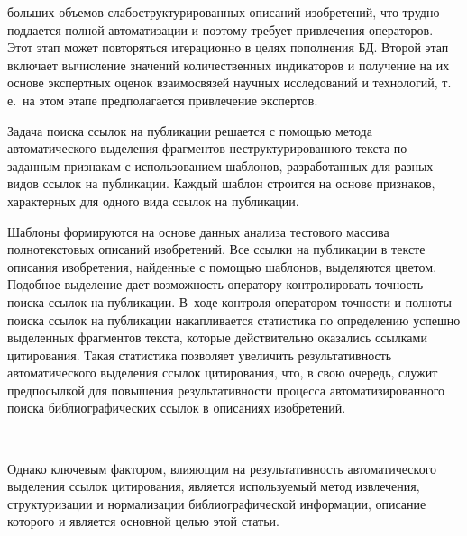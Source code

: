 \begin{multicols}{2}

\noindent
 больших 
объемов слабоструктурированных описаний изобретений, что трудно поддается полной 
автоматизации и поэтому требует привлечения операторов. Этот этап может повторяться 
итерационно в целях пополнения БД. Второй этап включает вычисление значений 
количественных индикаторов и получение на их основе экспертных оценок взаимосвязей 
научных исследований и технологий, т.\,е.\ на этом этапе предполагается привлечение 
экспертов.
  
  Задача поиска ссылок на публикации решается с помощью метода автоматического 
выделения фрагментов неструктурированного текста по заданным признакам с использованием 
шаблонов, разработанных для разных видов ссылок на публикации. Каждый шаблон строится 
на основе признаков, характерных для одного вида ссылок на публи\-кации.
{

}
      

      
  Шаблоны формируются на основе данных анализа тестового массива полнотекстовых 
описаний изобретений. Все ссылки на публикации в тексте описания изобретения, найденные с 
помощью шаб\-ло\-нов, выделяются цветом. Подобное выделение дает возможность оператору 
контролировать точность поиска ссылок на публикации. В~ходе контроля оператором точности 
и полноты поиска ссылок на публикации накапливается статистика по определению успешно 
выделенных фрагментов текста, которые действительно оказались ссылками цитирования. 
Такая статистика позволяет увеличить результативность автоматического выделения ссылок 
цитирования, что, в свою очередь, служит предпосылкой для повышения результатив\-ности 
процесса автоматизированного поиска библиографических ссылок в описаниях изобретений.

\begin{figure*}[b] %
         \vspace*{9pt}
 \begin{center}
 \mbox{%
 \epsfxsize=114.043mm
 }
 \end{center}
 \vspace*{-6pt}
      \end{figure*}
  
  Однако ключевым фактором, влияющим на результативность автоматического выделения 
ссылок цитирования, является используемый метод извлечения, структуризации и 
нормализации библиографической информации, описание которого и является основной целью 
этой статьи.


\end{multicols}
